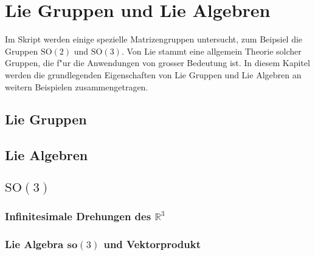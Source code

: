 %
%
%
\chapter{Lie Gruppen und Lie Algebren}
Im Skript werden einige spezielle Matrizengruppen untersucht,
zum Beipsiel die Gruppen $\textrm{SO}(2)$ und $\textrm{SO}(3)$.
Von Lie stammt eine allgemein Theorie solcher Gruppen, die f"ur die
Anwendungen von grosser Bedeutung ist.
In diesem Kapitel werden die grundlegenden Eigenschaften von 
Lie Gruppen und Lie Algebren an weitern Beispielen zusammengetragen.

\section{Lie Gruppen}
\section{Lie Algebren}
\section{$\textrm{SO}(3)$}
\subsection{Infinitesimale Drehungen des $\mathbb R^3$}
\subsection{Lie Algebra $\textbf{so}(3)$ und Vektorprodukt}


